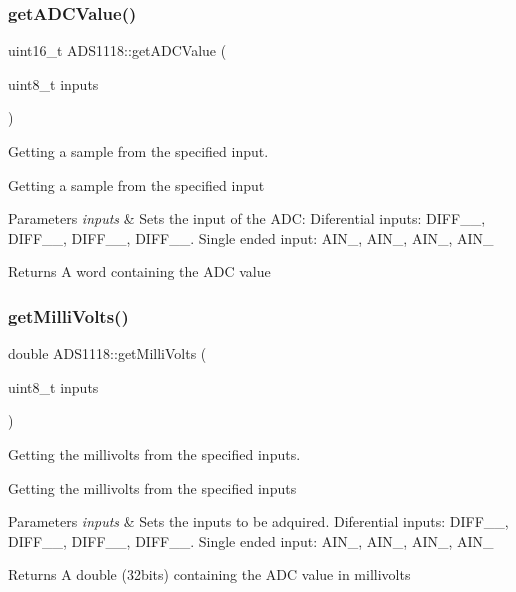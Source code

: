 \subsubsection{\texorpdfstring{get\+A\+D\+C\+Value()}{getADCValue()}}
{\footnotesize\ttfamily uint16\+\_\+t A\+D\+S1118\+::get\+A\+D\+C\+Value (\begin{DoxyParamCaption}\item[{uint8\+\_\+t}]{inputs }\end{DoxyParamCaption})}



Getting a sample from the specified input. 

Getting a sample from the specified input 
\begin{DoxyParams}{Parameters}
{\em inputs} & Sets the input of the A\+DC\+: Diferential inputs\+: D\+I\+F\+F\+\_\+\_, D\+I\+F\+F\+\_\+\_, D\+I\+F\+F\+\_\+\_, D\+I\+F\+F\+\_\+\_. Single ended input\+: A\+I\+N\+\_, A\+I\+N\+\_, A\+I\+N\+\_, A\+I\+N\+\_ \\
\hline
\end{DoxyParams}
\begin{DoxyReturn}{Returns}
A word containing the A\+DC value 
\end{DoxyReturn}
\mbox{\label{class_a_d_s1118_a11e4c070217773d71da1d22506e64c00}} 
\subsubsection{\texorpdfstring{get\+Milli\+Volts()}{getMilliVolts()}\hspace{0.1cm}{\footnotesize\ttfamily [1/2]}}
{\footnotesize\ttfamily double A\+D\+S1118\+::get\+Milli\+Volts (\begin{DoxyParamCaption}\item[{uint8\+\_\+t}]{inputs }\end{DoxyParamCaption})}



Getting the millivolts from the specified inputs. 

Getting the millivolts from the specified inputs 
\begin{DoxyParams}{Parameters}
{\em inputs} & Sets the inputs to be adquired. Diferential inputs\+: D\+I\+F\+F\+\_\+\_, D\+I\+F\+F\+\_\+\_, D\+I\+F\+F\+\_\+\_, D\+I\+F\+F\+\_\+\_. Single ended input\+: A\+I\+N\+\_, A\+I\+N\+\_, A\+I\+N\+\_, A\+I\+N\+\_ \\
\hline
\end{DoxyParams}
\begin{DoxyReturn}{Returns}
A double (32bits) containing the A\+DC value in millivolts 
\end{DoxyReturn}
\mbox{\label{class_a_d_s1118_a5d88241e78575ca86f6206f02cec0614}} 
